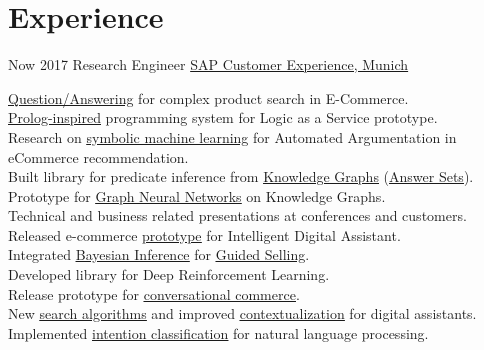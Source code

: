 \documentclass[letterpaper]{twentysecondcv} %
\begin{document}
 \makeprofile %


\section{Experience}

\begin{twenty} %
\twentyitem
    	{Now}
		{2017}
        {Research Engineer}
        {\href{https://www.sap.com}{SAP Customer Experience,  Munich}}
        {}
        {
        \href{https://blogs.sap.com/2022/07/14/question-answering-in-ecommerce-search/}{\underline{Question/Answering}} for complex product search in E-Commerce.\\
        \href{https://blogs.sap.com/2022/04/26/ludwig-experimental-programming-system-for-business-services/}{\underline{Prolog-inspired}} programming system for Logic as a Service prototype.\\
        Research on \href{https://2022-eu.semantics.cc/socratic-digital-agent-persuasion-ecommerce-knowledge-logic-and-machine-learning}{\underline{symbolic machine learning}} for Automated Argumentation in eCommerce recommendation.\\
        Built library for predicate inference from \href{https://blogs.sap.com/tag/knowledge-graph/}{\underline{Knowledge Graphs}} (\href{https://blogs.sap.com/2020/11/25/rule-engines-and-knowledge-intensive-processing-with-answer-set-programming/}{\underline{Answer Sets}}).
        Prototype for \href{https://gfrison.com/2020/graph-convolution-networks}{\underline{Graph Neural Networks}} on Knowledge Graphs.\\
        Technical and business related presentations at conferences and customers.\\ 
        Released e-commerce \href{https://blogs.sap.com/tag/zefiro/}{\underline{prototype}} for Intelligent Digital Assistant.\\ 
        Integrated \href{https://github.com/sap/bayesian-network-builder}{\underline{Bayesian Inference}} for \href{https://blogs.sap.com/2020/09/22/bayesian-inference-for-guided-selling-sap-predictive-summit-talk/}{\underline{Guided Selling}}.\\
        Developed library for Deep Reinforcement Learning.\\
        Release prototype for \href{https://sapvideoa35699dc5.hana.ondemand.com/?entry_id=1_kp5hbyih}{\underline{conversational commerce}}.\\
        New \href{https://blogs.sap.com/2021/09/01/improve-conversational-commerce-search-with-knowledge-graphs/}{\underline{search algorithms}} and improved \href{https://gfrison.com/2018/03/14/stochastic-conversational-workflows/}{\underline{contextualization}}  for digital assistants. \\
        Implemented \href{https://gfrison.com/2017/09/01/deeplearning-in-text-classification/}{\underline{intention classification}} for natural language processing.
        
}
\end{twenty}
\end{document}
